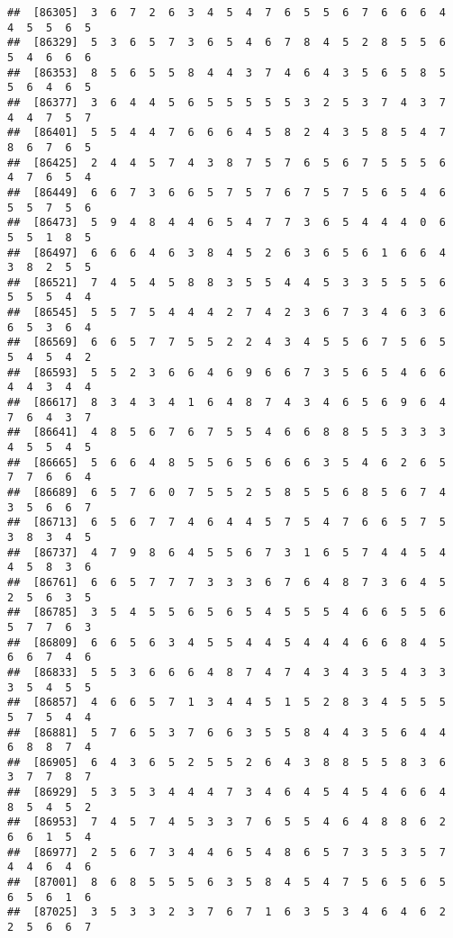 \documentclass[
]{book}
\begin{document}
\begin{verbatim}
##  [86305]  3  6  7  2  6  3  4  5  4  7  6  5  5  6  7  6  6  6  4  4  5  5  6  5
##  [86329]  5  3  6  5  7  3  6  5  4  6  7  8  4  5  2  8  5  5  6  5  4  6  6  6
##  [86353]  8  5  6  5  5  8  4  4  3  7  4  6  4  3  5  6  5  8  5  5  6  4  6  5
##  [86377]  3  6  4  4  5  6  5  5  5  5  5  3  2  5  3  7  4  3  7  4  4  7  5  7
##  [86401]  5  5  4  4  7  6  6  6  4  5  8  2  4  3  5  8  5  4  7  8  6  7  6  5
##  [86425]  2  4  4  5  7  4  3  8  7  5  7  6  5  6  7  5  5  5  6  4  7  6  5  4
##  [86449]  6  6  7  3  6  6  5  7  5  7  6  7  5  7  5  6  5  4  6  5  5  7  5  6
##  [86473]  5  9  4  8  4  4  6  5  4  7  7  3  6  5  4  4  4  0  6  5  5  1  8  5
##  [86497]  6  6  6  4  6  3  8  4  5  2  6  3  6  5  6  1  6  6  4  3  8  2  5  5
##  [86521]  7  4  5  4  5  8  8  3  5  5  4  4  5  3  3  5  5  5  6  5  5  5  4  4
##  [86545]  5  5  7  5  4  4  4  2  7  4  2  3  6  7  3  4  6  3  6  6  5  3  6  4
##  [86569]  6  6  5  7  7  5  5  2  2  4  3  4  5  5  6  7  5  6  5  5  4  5  4  2
##  [86593]  5  5  2  3  6  6  4  6  9  6  6  7  3  5  6  5  4  6  6  4  4  3  4  4
##  [86617]  8  3  4  3  4  1  6  4  8  7  4  3  4  6  5  6  9  6  4  7  6  4  3  7
##  [86641]  4  8  5  6  7  6  7  5  5  4  6  6  8  8  5  5  3  3  3  4  5  5  4  5
##  [86665]  5  6  6  4  8  5  5  6  5  6  6  6  3  5  4  6  2  6  5  7  7  6  6  4
##  [86689]  6  5  7  6  0  7  5  5  2  5  8  5  5  6  8  5  6  7  4  3  5  6  6  7
##  [86713]  6  5  6  7  7  4  6  4  4  5  7  5  4  7  6  6  5  7  5  3  8  3  4  5
##  [86737]  4  7  9  8  6  4  5  5  6  7  3  1  6  5  7  4  4  5  4  4  5  8  3  6
##  [86761]  6  6  5  7  7  7  3  3  3  6  7  6  4  8  7  3  6  4  5  2  5  6  3  5
##  [86785]  3  5  4  5  5  6  5  6  5  4  5  5  5  4  6  6  5  5  6  5  7  7  6  3
##  [86809]  6  6  5  6  3  4  5  5  4  4  5  4  4  4  6  6  8  4  5  6  6  7  4  6
##  [86833]  5  5  3  6  6  6  4  8  7  4  7  4  3  4  3  5  4  3  3  3  5  4  5  5
##  [86857]  4  6  6  5  7  1  3  4  4  5  1  5  2  8  3  4  5  5  5  5  7  5  4  4
##  [86881]  5  7  6  5  3  7  6  6  3  5  5  8  4  4  3  5  6  4  4  6  8  8  7  4
##  [86905]  6  4  3  6  5  2  5  5  2  6  4  3  8  8  5  5  8  3  6  3  7  7  8  7
##  [86929]  5  3  5  3  4  4  4  7  3  4  6  4  5  4  5  4  6  6  4  8  5  4  5  2
##  [86953]  7  4  5  7  4  5  3  3  7  6  5  5  4  6  4  8  8  6  2  6  6  1  5  4
##  [86977]  2  5  6  7  3  4  4  6  5  4  8  6  5  7  3  5  3  5  7  4  4  6  4  6
##  [87001]  8  6  8  5  5  5  6  3  5  8  4  5  4  7  5  6  5  6  5  6  5  6  1  6
##  [87025]  3  5  3  3  2  3  7  6  7  1  6  3  5  3  4  6  4  6  2  2  5  6  6  7

\end{verbatim}
\end{document}
